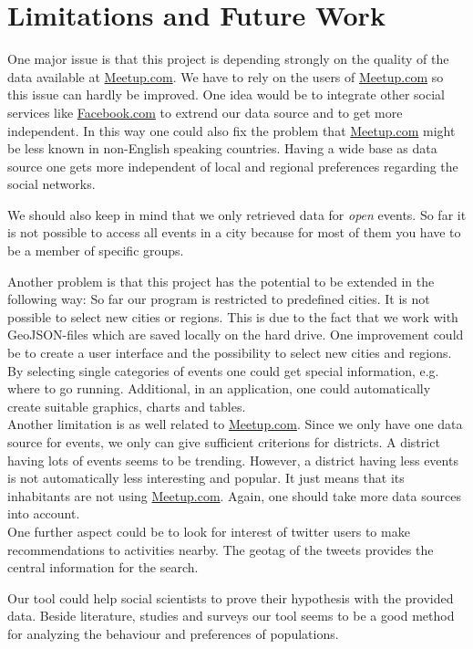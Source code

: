 \section{Limitations and Future Work}\label{sec:limitationsandfuturework}

One major issue is that this project is depending strongly on the quality of the data available at \url{Meetup.com}. We have to rely on the users of \url{Meetup.com} so this issue can hardly be improved. One idea would be to integrate other social services like \url{Facebook.com} to extrend our data source and to get more independent. In this way one could also fix the problem that \url{Meetup.com} might be less known in non-English speaking countries. Having a wide base as data source one gets more independent of local and regional preferences regarding the social networks.

We should also keep in mind that we only retrieved data for \emph{open} events. So far it is not possible to access all events in a city because for most of them you have to be a member of specific groups. 

Another problem is that this project has the potential to be extended in the following way: So far our program is restricted to predefined cities. It is not possible to select new cities or regions. This is due to the fact that we work with GeoJSON-files which are saved locally on the hard drive. One improvement could be to create a user interface and the possibility to select new cities and regions. By selecting single categories of events one could get special information, e.g. where to go running. Additional, in an application, one could automatically create suitable graphics, charts and tables.\\Another limitation is as well related to \url{Meetup.com}. Since we only have one data source for events, we only can give sufficient criterions for districts. A district having lots of events seems to be trending. However, a district having less events is not automatically less interesting and popular. It just means that its inhabitants are not using \url{Meetup.com}. Again, one should take more data sources into account.\\One further aspect could be to look for interest of twitter users to make recommendations to activities nearby. The geotag of the tweets provides the central information for the search.

Our tool could help social scientists to prove their hypothesis with the provided data. Beside literature, studies and surveys our tool seems to be a good method for analyzing the behaviour and preferences of populations.